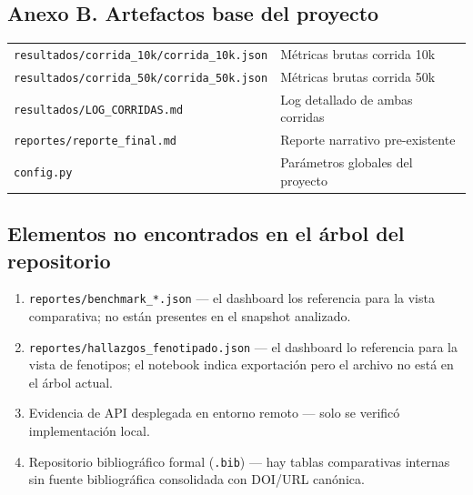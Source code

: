 \documentclass[12pt,a4paper]{article}
\begin{document}
\subsection*{Anexo B. Artefactos base del proyecto}

\begin{tabular}{ll}
  \texttt{resultados/corrida\_10k/corrida\_10k.json} & Métricas brutas corrida 10k\\
  \texttt{resultados/corrida\_50k/corrida\_50k.json} & Métricas brutas corrida 50k\\
  \texttt{resultados/LOG\_CORRIDAS.md} & Log detallado de ambas corridas\\
  \texttt{reportes/reporte\_final.md} & Reporte narrativo pre-existente\\
  \texttt{config.py} & Parámetros globales del proyecto\\
\end{tabular}

\subsection*{Elementos no encontrados en el árbol del repositorio}

\begin{enumerate}
  \item \texttt{reportes/benchmark\_*.json} — el dashboard los referencia para la vista comparativa; no están presentes en el snapshot analizado.
  \item \texttt{reportes/hallazgos\_fenotipado.json} — el dashboard lo referencia para la vista de fenotipos; el notebook indica exportación pero el archivo no está en el árbol actual.
  \item Evidencia de API desplegada en entorno remoto — solo se verificó implementación local.
  \item Repositorio bibliográfico formal (\texttt{.bib}) — hay tablas comparativas internas sin fuente bibliográfica consolidada con DOI/URL canónica.
\end{enumerate}
\end{document}
